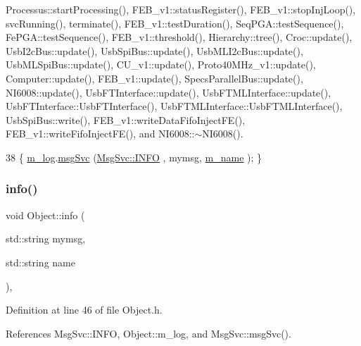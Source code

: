 Processus\+::start\+Processing(), F\+E\+B\+\_\+v1\+::status\+Register(), F\+E\+B\+\_\+v1\+::stop\+Inj\+Loop(), svc\+Running(), terminate(), F\+E\+B\+\_\+v1\+::test\+Duration(), Seq\+P\+G\+A\+::test\+Sequence(), Fe\+P\+G\+A\+::test\+Sequence(), F\+E\+B\+\_\+v1\+::threshold(), Hierarchy\+::tree(), Croc\+::update(), Usb\+I2c\+Bus\+::update(), Usb\+Spi\+Bus\+::update(), Usb\+M\+L\+I2c\+Bus\+::update(), Usb\+M\+L\+Spi\+Bus\+::update(), C\+U\+\_\+v1\+::update(), Proto40\+M\+Hz\+\_\+v1\+::update(), Computer\+::update(), F\+E\+B\+\_\+v1\+::update(), Specs\+Parallel\+Bus\+::update(), N\+I6008\+::update(), Usb\+F\+T\+Interface\+::update(), Usb\+F\+T\+M\+L\+Interface\+::update(), Usb\+F\+T\+Interface\+::\+Usb\+F\+T\+Interface(), Usb\+F\+T\+M\+L\+Interface\+::\+Usb\+F\+T\+M\+L\+Interface(), Usb\+Spi\+Bus\+::write(), F\+E\+B\+\_\+v1\+::write\+Data\+Fifo\+Inject\+F\+E(), F\+E\+B\+\_\+v1\+::write\+Fifo\+Inject\+F\+E(), and N\+I6008\+::$\sim$\+N\+I6008().


\begin{DoxyCode}
38 \{ \hyperlink{classObject_a0d269813dd7ac1f24bc143031e2963f2}{m\_log}.\hyperlink{classMsgSvc_ad25f18047920cc59a314e5098259711c}{msgSvc} (\hyperlink{classMsgSvc_ae671eb7301996cd049d2da8a65925926ad2fcf3f3e734fc41ee097cc23670ce51}{MsgSvc::INFO}    , mymsg, \hyperlink{classObject_a8b83c95c705d2c3ba0d081fe1710f48d}{m\_name} ); \}
\end{DoxyCode}
\mbox{\label{classObject_a1ca123253dfd30fc28b156f521dcbdae}} 
\subsubsection{\texorpdfstring{info()}{info()}\hspace{0.1cm}{\footnotesize\ttfamily [2/2]}}
{\footnotesize\ttfamily void Object\+::info (\begin{DoxyParamCaption}\item[{std\+::string}]{mymsg,  }\item[{std\+::string}]{name }\end{DoxyParamCaption})\hspace{0.3cm}{\ttfamily [inline]}, {\ttfamily [inherited]}}



Definition at line 46 of file Object.\+h.



References Msg\+Svc\+::\+I\+N\+FO, Object\+::m\+\_\+log, and Msg\+Svc\+::msg\+Svc().



